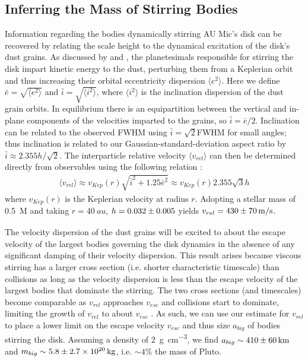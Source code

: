 \documentclass[modern]{aastex62}
\begin{document}
\subsection{Inferring the Mass of Stirring Bodies}
\label{inferring mass}

Information regarding the bodies dynamically stirring AU Mic's disk can be recovered by relating the scale height to the dynamical excitation of the disk's dust grains.
As discussed by \citet{thebault09} and \citet{quillen07}, the planetesimals responsible for stirring the disk impart kinetic energy to the dust, perturbing them from a Keplerian orbit and thus increasing their orbital eccentricity dispersion $\langle e^2 \rangle$. 
Here we define $\bar{e} = \sqrt{\langle e^2 \rangle}$ and $\bar{i} = \sqrt{\langle i^2 \rangle}$, where $\langle i^2 \rangle$ is the inclination dispersion of the dust grain orbits.
In equilibrium there is an equipartition between the vertical and in-plane components of the velocities imparted to the grains, so $\bar{i} = {\bar{e}}/{2}$.
Inclination can be related to the observed FWHM using $\bar{i} = \sqrt{2}$FWHM for small angles; thus inclination is related to our Gaussian-standard-deviation aspect ratio by $\bar{i} \approx 2.355 h / \sqrt{2}$.
The interparticle relative velocity $\langle v_{rel} \rangle$ can then be determined directly from observables using the following relation \citep{wetherill&stewart93,wyatt&dent02}:
\begin{gather}
  \langle v_{rel} \rangle \approx v_{Kep}(r) \sqrt{\bar{i}^2 + 1.25 \bar{e}^2} \approx v_{Kep}(r) 2.355 \sqrt{3} h
\end{gather}
where $v_{Kep}(r)$ is the Keplerian velocity at radius $r$. 
Adopting a stellar mass of \SI{0.5}{M_\sun} and taking $r = \SI{40}{au}$, $h=\num{0.032 \pm 0.005}$ yields $v_{rel} = \SI{430 \pm 70}{m/s}$.

The velocity dispersion of the dust grains will be excited to about the escape velocity of the largest bodies governing the disk dynamics in the absence of any significant damping of their velocity dispersion. 
This result arises because viscous stirring has a larger cross section (i.e. shorter characteristic timescale) than collisions as long as the velocity dispersion is less than the escape velocity of the largest bodies that dominate the stirring. 
The two cross sections (and timescales) become comparable as $v_{rel}$ approaches $v_{esc}$ and collisions start to dominate, limiting the growth of $v_{rel}$ to about 
$v_{esc}$ \citep[e.g.,][]{schlichting14}.
As such, we can use our estimate for $v_{rel}$ to place a lower limit on the escape velocity $v_{esc}$ and thus size $a_{big}$ of bodies stirring the disk.
Assuming a density of \SI{2}{\g.\cm^{-3}}, we find $a_{big} \sim \SI{410 \pm 60}{km}$ and $m_{big} \sim \SI{5.8 \pm 2.7e20}{kg}$, i.e. $\sim 4\%$ the mass of Pluto.
\end{document}
